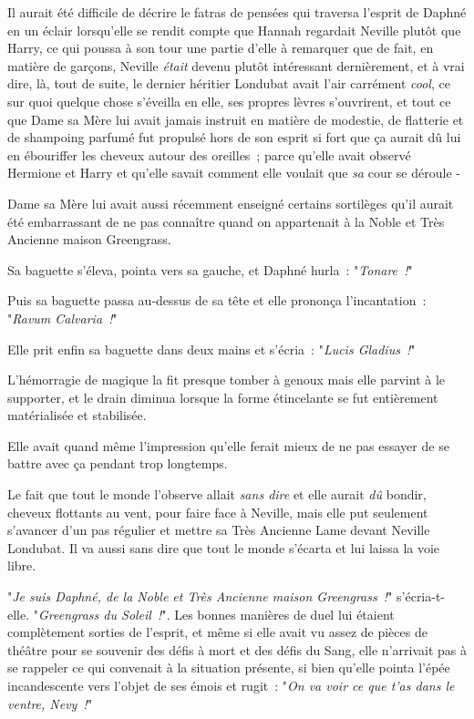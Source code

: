 Il aurait été difficile de décrire le fatras de pensées qui traversa l'esprit de Daphné en un éclair lorsqu'elle se rendit compte que Hannah regardait Neville plutôt que Harry, ce qui poussa à son tour une partie d'elle à remarquer que de fait, en matière de garçons, Neville \emph{était} devenu plutôt intéressant dernièrement, et à vrai dire, là, tout de suite, le dernier héritier Londubat avait l'air carrément \emph{cool}, ce sur quoi quelque chose s'éveilla en elle, ses propres lèvres s'ouvrirent, et tout ce que Dame sa Mère lui avait jamais instruit en matière de modestie, de flatterie et de shampoing parfumé fut propulsé hors de son esprit si fort que ça aurait dû lui en ébouriffer les cheveux autour des oreilles~; parce qu'elle avait observé Hermione et Harry et qu'elle savait comment elle voulait que \emph{sa} cour se déroule -

Dame sa Mère lui avait aussi récemment enseigné certains sortilèges qu'il aurait été embarrassant de ne pas connaître quand on appartenait à la Noble et Très Ancienne maison Greengrass.

Sa baguette s'éleva, pointa vers sa gauche, et Daphné hurla~: "\emph{Tonare~!}"

Puis sa baguette passa au-dessus de sa tête et elle prononça l'incantation~: "\emph{Ravum Calvaria~!}"

Elle prit enfin sa baguette dans deux mains et s'écria~: "\emph{Lucis Gladius~!}"

L'hémorragie de magique la fit presque tomber à genoux mais elle parvint à le supporter, et le drain diminua lorsque la forme étincelante se fut entièrement matérialisée et stabilisée.

Elle avait quand même l'impression qu'elle ferait mieux de ne pas essayer de se battre avec ça pendant trop longtemps.

Le fait que tout le monde l'observe allait \emph{sans dire} et elle aurait \emph{dû} bondir, cheveux flottants au vent, pour faire face à Neville, mais elle put seulement s'avancer d'un pas régulier et mettre sa Très Ancienne Lame devant Neville Londubat. Il va aussi sans dire que tout le monde s'écarta et lui laissa la voie libre.

"\emph{Je suis Daphné, de la Noble et Très Ancienne maison Greengrass~!}" s'écria-t-elle. "\emph{Greengrass du Soleil~!}". Les bonnes manières de duel lui étaient complètement sorties de l'esprit, et même si elle avait vu assez de pièces de théâtre pour se souvenir des défis à mort et des défis du Sang, elle n'arrivait pas à se rappeler ce qui convenait à la situation présente, si bien qu'elle pointa l'épée incandescente vers l'objet de ses émois et rugit~: "\emph{On va voir ce que t'as dans le ventre, Nevy~!}"

